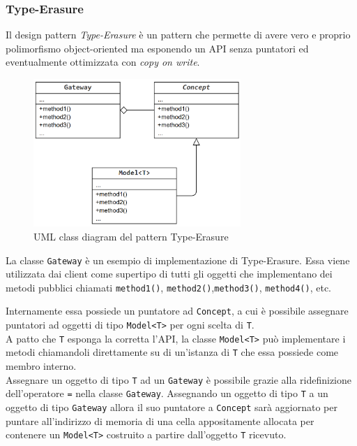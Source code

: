 
\subsubsection{Type-Erasure}
Il design pattern \textit{Type-Erasure} è un pattern che permette di avere vero e proprio polimorfismo 
object-oriented ma esponendo un API senza puntatori ed eventualmente ottimizzata con \textit{copy on write}.

\begin{figure}[H]
    \centering
        \includegraphics[width=0.7\textwidth]{../../Assets/TypeErasure.png}
    \caption{UML class diagram del pattern Type-Erasure}
\end{figure}

La classe \texttt{Gateway} è un esempio di implementazione di Type-Erasure. Essa viene utilizzata dai client 
come supertipo di tutti gli oggetti che implementano dei metodi pubblici chiamati \texttt{method1()}, 
\texttt{method2()},\texttt{method3()}, \texttt{method4()}, etc. \\

\newpage

Internamente essa possiede un puntatore ad \texttt{Concept}, a cui è possibile assegnare 
puntatori ad oggetti di tipo \texttt{Model<T>} per ogni scelta di \texttt{T}. \\

A patto che \texttt{T} esponga la corretta l'API, la classe \texttt{Model<T>} può implementare i metodi chiamandoli 
direttamente su di un'istanza di \texttt{T} che essa possiede come membro interno. \\

Assegnare un oggetto di tipo \texttt{T} ad un \texttt{Gateway} è possibile grazie alla ridefinizione dell'operatore \texttt{=}
nella classe \texttt{Gateway}. Assegnando un oggetto di tipo \texttt{T} a un oggetto di tipo \texttt{Gateway} allora 
il suo puntatore a \texttt{Concept} sarà aggiornato per puntare all'indirizzo di memoria di una cella appositamente allocata 
per contenere un \texttt{Model<T>} costruito a partire dall'oggetto \texttt{T} ricevuto. \\

